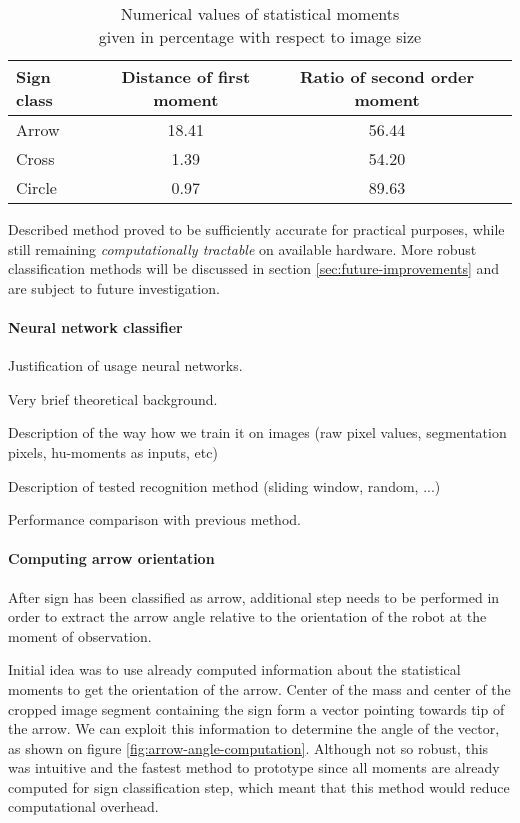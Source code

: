\begin{table}[th!]
\centering
	\begin{tabular}{l*{2}{c}r}
		\toprule
		Sign class			& Distance of first moment & Ratio of second order moment  \\
		\hline
		Arrow 				& 18.41 & 56.44  \\
		Cross            	& 1.39 & 54.20  \\
		Circle           	& 0.97 & 89.63  \\
		\bottomrule
	\end{tabular}
\caption{Numerical values of statistical moments \\given in percentage with respect to image size}
\label{tab:moments}
\end{table}

Described method proved to be sufficiently accurate for practical purposes, while still remaining \textit{computationally tractable} on available hardware. More robust classification methods will be discussed in section \ref{sec:future-improvements} and are subject to future investigation.

\paragraph{Neural network classifier}

Justification of usage neural networks.

Very brief theoretical background.

Description of the way how we train it on images (raw pixel values, segmentation pixels, hu-moments as inputs, etc)

Description of tested recognition method (sliding window, random, ...)

Performance comparison with previous method.

\paragraph{Computing arrow orientation}

After sign has been classified as arrow, additional step needs to be performed in order to extract the arrow angle relative to the orientation of the robot at the moment of observation.

Initial idea was to use already computed information about the statistical moments to get the orientation of the arrow. Center of the mass and center of the cropped image segment containing the sign form a vector pointing towards tip of the arrow. We can exploit this information to determine the angle of the vector, as shown on figure \ref{fig:arrow-angle-computation}. Although not so robust, this was intuitive and the fastest method to prototype since all moments are already computed for sign classification step, which meant that this method would reduce computational overhead.

